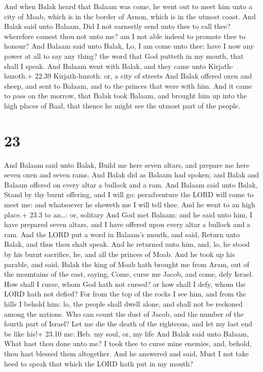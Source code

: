  And when Balak heard that Balaam was come, he went out
to meet him unto a city of Moab, which is in the border of Arnon, which
is in the utmost coast.  And Balak said unto Balaam, Did I
not earnestly send unto thee to call thee? wherefore camest thou not
unto me? am I not able indeed to promote thee to honour? 
And Balaam said unto Balak, Lo, I am come unto thee: have I now any
power at all to say any thing? the word that God putteth in my mouth,
that shall I speak.  And Balaam went with Balak, and they
came unto Kirjath-huzoth.+ 22.39 Kirjath-huzoth: or, a city of streets
 And Balak offered oxen and sheep, and sent to Balaam, and
to the princes that were with him.  And it came to pass on
the morrow, that Balak took Balaam, and brought him up into the high
places of Baal, that thence he might see the utmost part of the people.

\hypertarget{section-22}{%
\section{23}\label{section-22}}

 And Balaam said unto Balak, Build me here seven altars, and
prepare me here seven oxen and seven rams.  And Balak did as
Balaam had spoken; and Balak and Balaam offered on every altar a bullock
and a ram.  And Balaam said unto Balak, Stand by thy burnt
offering, and I will go: peradventure the LORD will come to meet me: and
whatsoever he sheweth me I will tell thee. And he went to an high
place.+ 23.3 to an\ldots: or, solitary  And God met Balaam:
and he said unto him, I have prepared seven altars, and I have offered
upon every altar a bullock and a ram.  And the LORD put a
word in Balaam's mouth, and said, Return unto Balak, and thus thou shalt
speak.  And he returned unto him, and, lo, he stood by his
burnt sacrifice, he, and all the princes of Moab.  And he
took up his parable, and said, Balak the king of Moab hath brought me
from Aram, out of the mountains of the east, saying, Come, curse me
Jacob, and come, defy Israel.  How shall I curse, whom God
hath not cursed? or how shall I defy, whom the LORD hath not defied?
 For from the top of the rocks I see him, and from the hills
I behold him: lo, the people shall dwell alone, and shall not be
reckoned among the nations.  Who can count the dust of
Jacob, and the number of the fourth part of Israel? Let me die the death
of the righteous, and let my last end be like his!+ 23.10 me: Heb. my
soul, or, my life  And Balak said unto Balaam, What hast
thou done unto me? I took thee to curse mine enemies, and, behold, thou
hast blessed them altogether.  And he answered and said,
Must I not take heed to speak that which the LORD hath put in my mouth?

